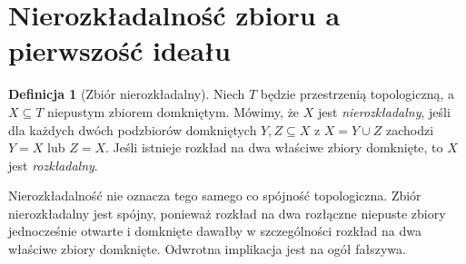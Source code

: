 \documentclass[11pt,a4paper,openany]{report}
\numberwithin{equation}{section}
\theoremstyle{plain}
\theoremstyle{definition}
\newtheorem{definicja}[twierdzenie]{Definicja}
\theoremstyle{remark}
\begin{document}
\section{Nierozkładalność zbioru a pierwszość ideału}

\begin{definicja}[Zbiór nierozkładalny]
Niech $T$ będzie przestrzenią topologiczną, a $X\subseteq T$
niepustym zbiorem domkniętym.
Mówimy, że $X$ jest \emph{nierozkładalny}, jeśli dla każdych
dwóch podzbiorów domkniętych $Y,Z\subseteq X$ z
$X=Y\cup Z$ zachodzi $Y=X$ lub $Z=X$.
Jeśli istnieje rozkład na dwa właściwe zbiory domknięte,
to $X$ jest \emph{rozkładalny}.
\end{definicja}

Nierozkładalność nie oznacza tego samego co spójność topologiczna.
Zbiór nierozkładalny jest spójny, ponieważ rozkład na dwa
rozłączne niepuste zbiory jednocześnie otwarte i domknięte
dawałby w szczególności rozkład na dwa właściwe zbiory domknięte.
Odwrotna implikacja jest na ogół fałszywa.
\end{document}
